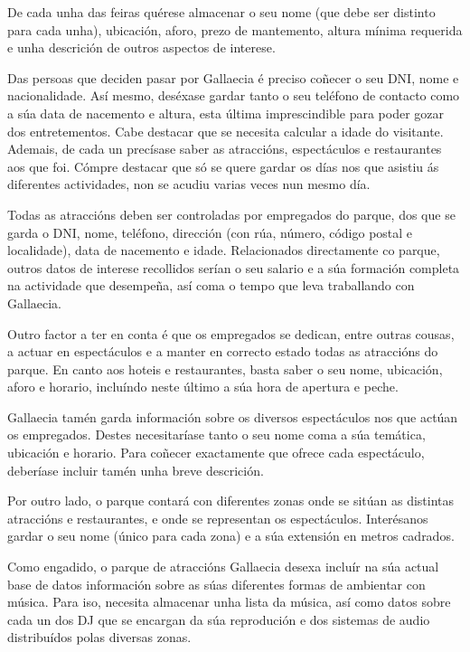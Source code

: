 \documentclass[12pt,a4paper]{book}
\theoremstyle{definition}
\theoremstyle{break}
\begin{document}
	De cada unha das feiras quérese almacenar o seu nome (que debe ser distinto para cada unha), ubicación, aforo, prezo de mantemento, altura mínima requerida e unha descrición de outros aspectos de interese.
	
	Das persoas que deciden pasar por {\logo Gallaecia} é preciso coñecer o seu DNI, nome e nacionalidade. Así mesmo, deséxase gardar tanto o seu teléfono de contacto como a súa data de nacemento e altura, esta última imprescindible para poder gozar dos entretementos. Cabe destacar que se necesita calcular a idade do visitante. Ademais, de cada un precísase saber as atraccións, espectáculos e restaurantes aos que foi. Cómpre destacar que só se quere gardar os días nos que asistiu ás diferentes actividades, non se acudiu varias veces nun mesmo día.
	
	Todas as atraccións deben ser controladas por empregados do parque, dos que se garda o DNI, nome, teléfono, dirección (con rúa, número, código postal e localidade), data de nacemento e idade. Relacionados directamente co parque, outros datos de interese recollidos serían o seu salario e a súa formación completa na actividade que desempeña, así coma o tempo que leva traballando con {\logo Gallaecia}.
	
	Outro factor a ter en conta é que os empregados se dedican, entre outras cousas, a actuar en espectáculos e a manter en correcto estado todas as atraccións do parque. En canto aos hoteis e restaurantes, basta saber o seu nome, ubicación, aforo e horario, incluíndo neste último a súa hora de apertura e peche.
	
	{\logo Gallaecia} tamén garda información sobre os diversos espectáculos nos que actúan os empregados. Destes necesitaríase tanto o seu nome coma a súa temática, ubicación e horario. Para coñecer exactamente que ofrece cada espectáculo, deberíase incluir tamén unha breve descrición.
	
	Por outro lado, o parque contará con diferentes zonas onde se sitúan as distintas atraccións e restaurantes, e onde se representan os espectáculos. Interésanos gardar o seu nome (único para cada zona) e a súa extensión en metros cadrados.
	
	Como engadido, o parque de atraccións {\logo Gallaecia} desexa incluír na súa actual base de datos información sobre as súas diferentes formas de ambientar con música. Para iso, necesita almacenar unha lista da música, así como datos sobre cada un dos DJ que
	se encargan da súa reprodución e dos sistemas de audio distribuídos polas
	diversas zonas.
	
\end{document}
